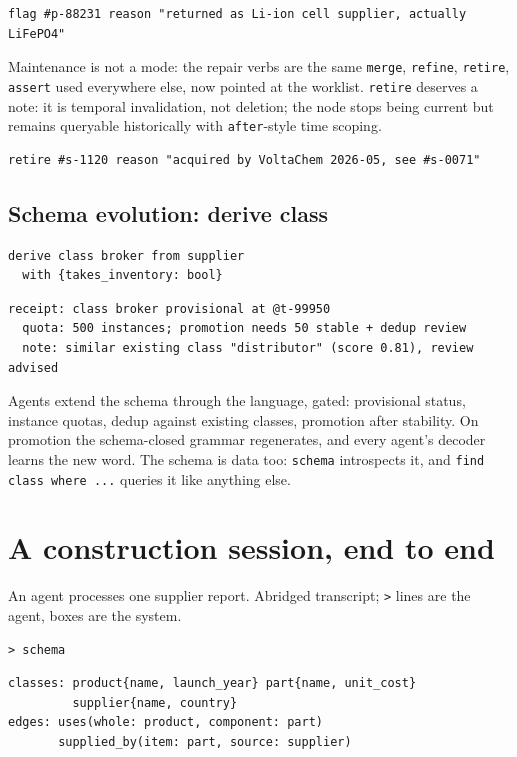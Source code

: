 \documentclass[11pt]{article}
\begin{document}
\begin{lstlisting}[style=new]
flag #p-88231 reason "returned as Li-ion cell supplier, actually LiFePO4"
\end{lstlisting}

Maintenance is not a mode: the repair verbs are the same \texttt{merge}, \texttt{refine}, \texttt{retire}, \texttt{assert} used everywhere else, now pointed at the worklist. \texttt{retire} deserves a note: it is temporal invalidation, not deletion; the node stops being current but remains queryable historically with \texttt{after}-style time scoping.

\begin{lstlisting}[style=new]
retire #s-1120 reason "acquired by VoltaChem 2026-05, see #s-0071"
\end{lstlisting}

\subsection{Schema evolution: derive class}

\begin{lstlisting}[style=new]
derive class broker from supplier
  with {takes_inventory: bool}
\end{lstlisting}

\begin{lstlisting}[style=result]
receipt: class broker provisional at @t-99950
  quota: 500 instances; promotion needs 50 stable + dedup review
  note: similar existing class "distributor" (score 0.81), review advised
\end{lstlisting}

Agents extend the schema through the language, gated: provisional status, instance quotas, dedup against existing classes, promotion after stability. On promotion the schema-closed grammar regenerates, and every agent's decoder learns the new word. The schema is data too: \texttt{schema} introspects it, and \texttt{find class where ...} queries it like anything else.

\section{A construction session, end to end}

An agent processes one supplier report. Abridged transcript; \texttt{>} lines are the agent, boxes are the system.

\begin{lstlisting}[style=new]
> schema
\end{lstlisting}
\begin{lstlisting}[style=result]
classes: product{name, launch_year} part{name, unit_cost}
         supplier{name, country}
edges: uses(whole: product, component: part)
       supplied_by(item: part, source: supplier)
\end{lstlisting}
\end{document}
